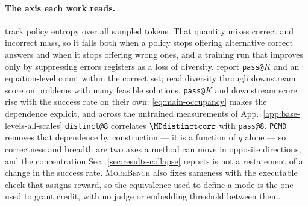 \documentclass{article}
\makeatletter
\newcommand{\1}{\mathbf 1}
\newcommand{\mb}{\textsc{ModeBench}}
\newcommand{\pmd}{\texttt{PCMD}}
\newcommand{\distk}{\texttt{distinct@8}}
\theoremstyle{remark}
\theoremstyle{definition}
\theoremstyle{plain}
\makeatother
\begin{document}
\paragraph{The axis each work reads.}
\citet{cui2025entropy} track policy entropy over all sampled tokens. That
quantity mixes correct and incorrect mass, so it falls both when a policy stops
offering alternative correct answers and when it stops offering wrong ones, and
a training run that improves only by suppressing errors registers as a loss of
diversity. \citet{lochab2026ucpo} report \texttt{pass@}$K$ and an
equation-level count within the correct set; \citet{li2026distribution} read
diversity through downstream score on problems with many feasible solutions.
\texttt{pass@}$K$ and downstream score rise with the success rate on their
own: \eqref{eq:main-occupancy} makes the dependence explicit, and across the
\MDcells{} untrained measurements of App.~\ref{app:base-levels-all-scales}
\distk{} correlates $\MDdistinctcorr$ with \texttt{pass@8}.
\pmd{} removes that dependence by construction --- it is a function of $q$
alone --- so correctness and breadth are two axes a method can move in opposite
directions, and the concentration Sec.~\ref{sec:results-collapse} reports is
not a restatement of a change in the success rate. \mb{} also fixes sameness with the executable check that assigns
reward, so the equivalence used to define a mode is the one used to grant
credit, with no judge or embedding threshold between them.
\end{document}
